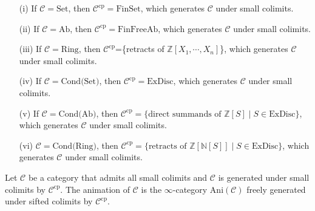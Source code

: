 \documentclass[UTF8,12,a4paper]{ctexart}
\theoremstyle{definition}
\begin{document}
\exm 
\begin{itemize}
	\item [(i)] If $\mathcal{C}=\text{Set}$, then $\mathcal{C}^\text{cp}=\text{FinSet}$, which generates $\mathcal{C}$ under small colimits.
	\item [(ii)]If $\mathcal{C}=\text{Ab}$, then $\mathcal{C}^\text{cp}=\text{FinFreeAb}$, which generates $\mathcal{C}$ under small colimits.
	\item [(iii)]If $\mathcal{C}=\text{Ring}$, then $\mathcal{C}^\text{cp}$=\{retracts of $\mathbb{Z}[X_1,\cdots,X_n]$\}, which generates $\mathcal{C}$ under small colimits.
	\item [(iv)]If $\mathcal{C}=\text{Cond(Set)}$, then $\mathcal{C}^\text{cp}=\text{ExDisc}$, which generates $\mathcal{C}$ under small colimits.
	\item [(v)]If $\mathcal{C}=\text{Cond(Ab)}$, then $\mathcal{C}^\text{cp}=\{\text{direct summands of }\mathbb{Z}[S]\mid S\in\text{ExDisc} \}$, which generates $\mathcal{C}$ under small colimits.
	\item [(vi)] $\mathcal{C}=\text{Cond(Ring)}$, then $\mathcal{C}^\text{cp}=\{\text{retracts of } \mathbb{Z}[\mathbb{N}[S]]\mid S\in\text{ExDisc}  \}$, which generates $\mathcal{C}$ under small colimits.
\end{itemize}

\dfn 
Let $\mathcal{C}$ be a category that admits all small colimits and
$\mathcal{C}$ is generated under small colimits by  $\mathcal{C}^\text{cp}$. The animation of $\mathcal{C}$ is the $\infty$-category $\text{Ani}(\mathcal{C})$ freely generated under sifted colimits by $\mathcal{C}^\text{cp}$.
 
\end{document}
